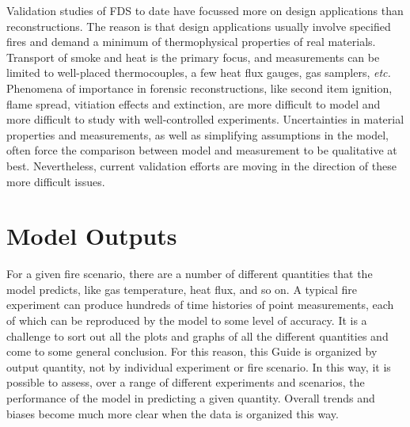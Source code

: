 Validation  studies  of FDS  to  date  have  focussed more  on  design
applications   than  reconstructions.  The   reason  is   that  design
applications usually involve specified  fires and demand a minimum of
thermophysical properties  of real materials.  Transport  of smoke and
heat  is  the  primary  focus,  and measurements  can  be  limited  to
well-placed thermocouples, a few  heat flux gauges, gas samplers, {\em
etc.} Phenomena of importance in forensic reconstructions, like second
item  ignition, flame  spread, vitiation  effects and  extinction, are
more   difficult  to   model  and   more  difficult   to   study  with
well-controlled experiments. Uncertainties  in material properties and
measurements, as  well as simplifying assumptions in  the model, often
force the  comparison between model and measurement  to be qualitative
at best.  Nevertheless, current validation  efforts are moving  in the
direction of these more difficult issues.




\section{Model Outputs}

For a given fire scenario, there are a number of different quantities that the model predicts, like gas temperature, heat flux, and so on. A typical
fire experiment can produce hundreds of time histories of point measurements, each of which can be reproduced by the model to some level of accuracy.
It is a challenge to sort out all the plots and graphs of all the different quantities and come to some general conclusion. For this reason, this Guide
is organized by output quantity, not by individual experiment or fire scenario. In this way, it is possible to assess, over a range of different experiments
and scenarios, the performance of the model in predicting a given quantity. Overall trends and biases become much more clear when the data is organized this way.

